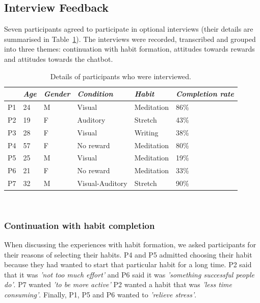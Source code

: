 \documentclass{scaffold/sigchi}
\begin{document}
\subsection{Interview Feedback}
Seven participants agreed to participate in optional interviews (their details are summarised in Table~\ref{table:transcript_participant_breakdown}). The interviews were recorded, transcribed and grouped into three themes: continuation with habit formation, attitudes towards rewards and attitudes towards the chatbot.

\begin{table}[b]
  \begin{tabular}{l l l l l l}
    \multicolumn{1}{l}{\small \textit{~}} &
    \multicolumn{1}{l}{\small \textit{Age}} & 
    \multicolumn{1}{l}{\small \textit{Gender}} & 
    \multicolumn{1}{l}{\small \textit{Condition}} &
    \multicolumn{1}{l}{\small \textit{Habit}} &
    \multicolumn{1}{p{1cm}}{\small \textit{Completion rate}} \\
    \midrule
    P1 & 24 & M & Visual & Meditation & 86\% \\
    P2 & 19 & F & Auditory & Stretch & 43\% \\ 
    P3 & 28 & F & Visual & Writing & 38\% \\
    P4 & 57 & F & No reward & Meditation & 80\% \\ 
    P5 & 25 & M & Visual & Meditation & 19\% \\ 
    P6 & 21 & F & No reward & Meditation & 33\% \\ 
    P7 & 32 & M & Visual-Auditory & Stretch & 90\% \\
  \end{tabular}
  \caption{Details of participants who were interviewed.}~\label{table:transcript_participant_breakdown}
\end{table}

\subsubsection{Continuation with habit completion}
When discussing the experiences with habit formation, we asked participants for their reasons of selecting their habits. P4 and P5 admitted choosing their habit because they had wanted to start that particular habit for a long time. P2 said that it was \textit{'not too much effort'} and P6 said it was \textit{'something successful people do'}. P7 wanted \textit{'to be more active'} P2 wanted a habit that was \textit{'less time consuming'}. Finally, P1, P5 and P6 wanted to \textit{'relieve stress'}. 
\end{document}
